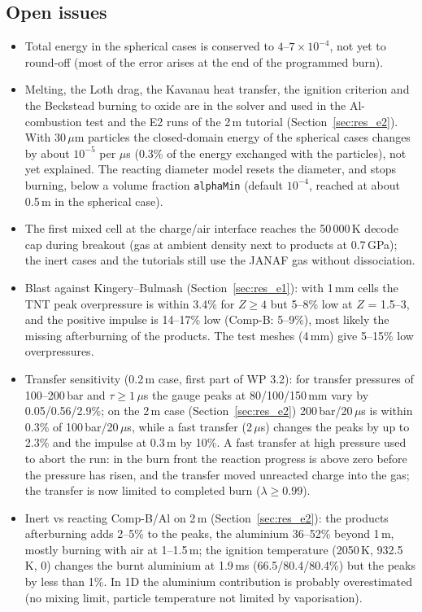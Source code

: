 \documentclass{article}
\begin{document}
\subsection{Open issues}

\begin{itemize}
    \item Total energy in the spherical cases is conserved to $4$--$7\times10^{-4}$, not yet to round-off (most of the error arises at the end of the programmed burn).
    \item Melting, the Loth drag, the Kavanau heat transfer, the ignition criterion and the Beckstead burning to oxide are in the solver and used in the Al-combustion test and the E2 runs of the 2\,m tutorial (Section~\ref{sec:res_e2}). With 30\,$\mu$m particles the closed-domain energy of the spherical cases changes by about $10^{-5}$ per $\mu$s (0.3\% of the energy exchanged with the particles), not yet explained. The reacting diameter model resets the diameter, and stops burning, below a volume fraction \texttt{alphaMin} (default $10^{-4}$, reached at about 0.5\,m in the spherical case).
    \item The first mixed cell at the charge/air interface reaches the 50\,000\,K decode cap during breakout (gas at ambient density next to products at 0.7\,GPa); the inert cases and the tutorials still use the JANAF gas without dissociation.
    \item Blast against Kingery--Bulmash (Section~\ref{sec:res_e1}): with 1\,mm cells the TNT peak overpressure is within 3.4\% for $Z \ge 4$ but 5--8\% low at $Z$ = 1.5--3, and the positive impulse is 14--17\% low (Comp-B: 5--9\%), most likely the missing afterburning of the products. The test meshes (4\,mm) give 5--15\% low overpressures.
    \item Transfer sensitivity (0.2\,m case, first part of WP 3.2): for transfer pressures of 100--200\,bar and $\tau \ge 1\,\mu$s the gauge peaks at 80/100/150\,mm vary by 0.05/0.56/2.9\%; on the 2\,m case (Section~\ref{sec:res_e2}) 200\,bar/20\,$\mu$s is within 0.3\% of 100\,bar/20\,$\mu$s, while a fast transfer (2\,$\mu$s) changes the peaks by up to 2.3\% and the impulse at 0.3\,m by 10\%. A fast transfer at high pressure used to abort the run: in the burn front the reaction progress is above zero before the pressure has risen, and the transfer moved unreacted charge into the gas; the transfer is now limited to completed burn ($\lambda \ge 0.99$).
    \item Inert vs reacting Comp-B/Al on 2\,m (Section~\ref{sec:res_e2}): the products afterburning adds 2--5\% to the peaks, the aluminium 36--52\% beyond 1\,m, mostly burning with air at 1--1.5\,m; the ignition temperature (2050\,K, 932.5\,K, 0) changes the burnt aluminium at 1.9\,ms (66.5/80.4/80.4\%) but the peaks by less than 1\%. In 1D the aluminium contribution is probably overestimated (no mixing limit, particle temperature not limited by vaporisation).

\end{itemize}
\end{document}
